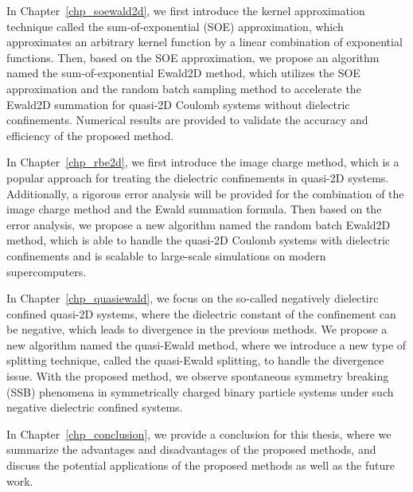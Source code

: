 In Chapter~\ref{chp_soewald2d}, we first introduce the kernel approximation technique called the sum-of-exponential (SOE) approximation, which approximates an arbitrary kernel function by a linear combination of exponential functions.
Then, based on the SOE approximation, we propose an algorithm named the sum-of-exponential Ewald2D method, which utilizes the SOE approximation and the random batch sampling method to accelerate the Ewald2D summation for quasi-2D Coulomb systems without dielectric confinements.
Numerical results are provided to validate the accuracy and efficiency of the proposed method.

In Chapter~\ref{chp_rbe2d}, we first introduce the image charge method, which is a popular approach for treating the dielectric confinements in quasi-2D systems.
Additionally, a rigorous error analysis will be provided for the combination of the image charge method and the Ewald summation formula.
Then based on the error analysis, we propose a new algorithm named the random batch Ewald2D method, which is able to handle the quasi-2D Coulomb systems with dielectric confinements and is scalable to large-scale simulations on modern supercomputers.


In Chapter~\ref{chp_quasiewald}, we focus on the so-called negatively dielectirc confined quasi-2D systems, where the dielectric constant of the confinement can be negative, which leads to divergence in the previous methods.
We propose a new algorithm named the quasi-Ewald method, where we introduce a new type of splitting technique, called the quasi-Ewald splitting, to handle the divergence issue.
With the proposed method, we observe spontaneous symmetry breaking (SSB) phenomena in symmetrically charged binary particle systems under such negative dielectric confined systems.

In Chapter~\ref{chp_conclusion}, we provide a conclusion for this thesis, where we summarize the advantages and disadvantages of the proposed methods, and discuss the potential applications of the proposed methods as well as the future work.